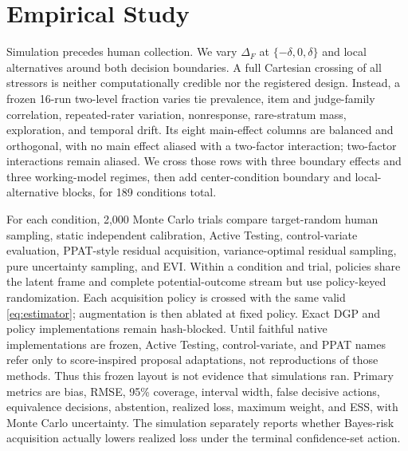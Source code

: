 \documentclass{article}
\begin{document}
\section{Empirical Study}
\label{sec:results}

Simulation precedes human collection. We vary $\Delta_F$ at
$\{-\delta,0,\delta\}$ and local alternatives around both decision boundaries.
A full Cartesian crossing of all stressors is neither computationally credible
nor the registered design. Instead, a frozen 16-run two-level fraction varies
tie prevalence, item and judge-family correlation, repeated-rater variation,
nonresponse, rare-stratum mass, exploration, and temporal drift. Its eight
main-effect columns are balanced and orthogonal, with no main effect aliased
with a two-factor interaction; two-factor interactions remain aliased. We
cross those rows with three boundary effects and three working-model regimes,
then add center-condition boundary and local-alternative blocks, for 189
conditions total.

For each condition, 2,000 Monte Carlo trials compare target-random human
sampling, static independent calibration, Active Testing, control-variate
evaluation, PPAT-style residual acquisition, variance-optimal residual
sampling, pure uncertainty sampling, and EVI. Within a condition and trial,
policies share the latent frame and complete potential-outcome stream but use
policy-keyed randomization. Each acquisition policy is crossed with the same
valid \cref{eq:estimator}; augmentation is then ablated at fixed policy. Exact
DGP and policy implementations remain hash-blocked. Until faithful native
implementations are frozen, Active Testing, control-variate, and PPAT names
refer only to score-inspired proposal adaptations, not reproductions of those
methods. Thus this frozen layout is
not evidence that simulations ran. Primary
metrics are bias, RMSE, 95\% coverage, interval width, false decisive actions,
equivalence decisions, abstention, realized loss, maximum weight, and ESS,
with Monte Carlo uncertainty. The simulation separately reports whether
Bayes-risk acquisition actually lowers realized loss under the terminal
confidence-set action.
\end{document}
